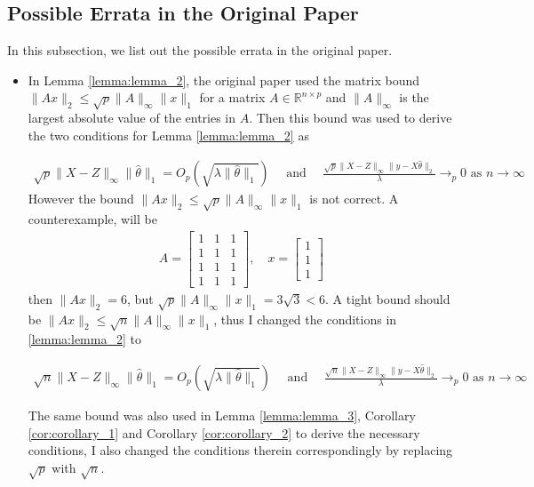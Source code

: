 \documentclass[a4paper]{article}
\newcommand{\RR}{\mathbb{R}}
\begin{document}
\subsection{Possible Errata in the Original Paper}
In this subsection, we list out the possible errata in the original paper.

\begin{itemize}
\item In Lemma \ref{lemma:lemma_2}, the original paper used the matrix bound $\|Ax\|_2\leq \sqrt{p}\|A\|_\infty\|x\|_1$ for a matrix $A\in\RR^{n\times p}$ and $\|A\|_\infty$ is the largest absolute value of the entries in $A$. Then this bound was used to derive the two conditions for Lemma \ref{lemma:lemma_2} as

\begin{align*}
\sqrt{p}\|X-Z\|_\infty\|\hat{\theta}\|_1 =O_p(\sqrt{\lambda\|\hat{\theta}\|_1}) \quad \text{ and }\quad  \frac{\sqrt{p}\|X-Z\|_\infty\|y-X\hat{\theta}\|_2}{\lambda} \rightarrow_p 0 \text{ as } n\rightarrow \infty
\end{align*}
However the bound $\|Ax\|_2\leq \sqrt{p}\|A\|_\infty\|x\|_1$ is not correct. A counterexample, will be
\begin{align*}
A = 
\begin{bmatrix}
1 & 1 & 1\\
1 & 1 & 1\\
1 & 1 & 1\\
1 & 1 & 1
\end{bmatrix}
,\quad x=
\begin{bmatrix}
1\\
1\\
1
\end{bmatrix}
\end{align*}
then $\|Ax\|_2 = 6$, but $\sqrt{p}\|A\|_\infty\|x\|_1 = 3\sqrt{3} < 6$. A tight bound should be $\|Ax\|_2\leq \sqrt{n}\|A\|_\infty\|x\|_1$, thus I changed the conditions in \ref{lemma:lemma_2} to

\begin{align*}
\sqrt{n}\|X-Z\|_\infty\|\hat{\theta}\|_1 =O_p(\sqrt{\lambda\|\hat{\theta}\|_1}) \quad \text{ and }\quad  \frac{\sqrt{n}\|X-Z\|_\infty\|y-X\hat{\theta}\|_2}{\lambda} \rightarrow_p 0 \text{ as } n\rightarrow \infty
\end{align*}

The same bound was also used in Lemma \ref{lemma:lemma_3}, Corollary \ref{cor:corollary_1} and Corollary \ref{cor:corollary_2} to derive the necessary conditions, I also changed the conditions therein correspondingly by replacing $\sqrt{p}$ with $\sqrt{n}$.


\end{itemize}
\end{document}
